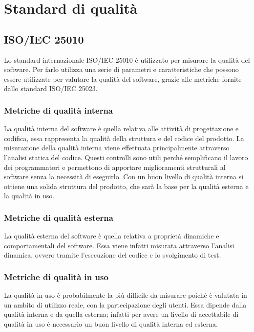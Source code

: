 \section{Standard di qualità}
	\subsection{ISO/IEC 25010}
		Lo standard internazionale ISO/IEC 25010 è utilizzato per misurare la qualità del software.
		Per farlo utilizza una serie di parametri e caratteristiche che possono essere utilizzate per valutare la qualità del software, grazie alle metriche fornite dallo standard ISO/IEC 25023.
		\subsubsection{Metriche di qualità interna}
			La qualità interna del software è quella relativa alle attività di progettazione e codifica, essa rappresenta la qualità della struttura e del codice del prodotto.
			La misurazione della qualità interna viene effettuata principalmente attraverso l'analisi statica del codice.
			Questi controlli sono utili perché semplificano il lavoro dei programmatori e permettono di apportare miglioramenti strutturali al software senza la necessità di eseguirlo.
			Con un buon livello di qualità interna si ottiene una solida struttura del prodotto, che sarà la base per la qualità esterna e la qualità in uso.
		\subsubsection{Metriche di qualità esterna}
			La qualità esterna del software è quella relativa a proprietà dinamiche e comportamentali del software. Essa viene infatti misurata attraverso l'analisi dinamica, ovvero tramite l'esecuzione del codice e lo svolgimento di test.
		\subsubsection{Metriche di qualità in uso}
			La qualità in uso è probabilmente la più difficile da misurare poiché è valutata in un ambito di utilizzo reale, con la partecipazione degli utenti.
			Essa dipende dalla qualità interna e da quella esterna; infatti per avere un livello di accettabile di qualità in uso è necessario un buon livello di qualità interna ed esterna.
